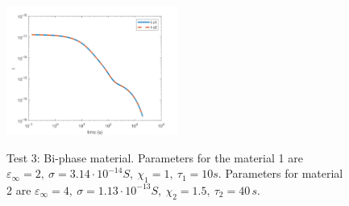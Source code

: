 \documentclass[11pt,a4paper]{article}
\begin{document}
\begin{figure}
{		\includegraphics[width=0.5\textwidth]{pictures/test3-comp.png}
	}
	\caption{Test 3: Bi-phase material. Parameters for the material 1 are \(\varepsilon_\infty = 2,\ \sigma = 3.14\cdot 10^{-14}S,\ \chi_1 = 1,\ \tau_1 = 10s\). Parameters for material 2 are \(\varepsilon_{\infty} = 4,\ \sigma = 1.13\cdot10^{-13}S,\ \chi_2 = 1.5,\ \tau_2 = 40\,s\).}
	\label{fig:test3}
	
\end{figure}
\end{document}
